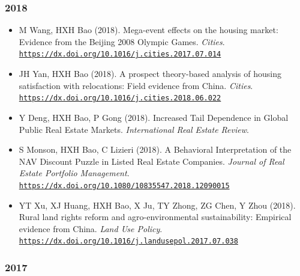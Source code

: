 \documentclass[11pt,a4paper]{article}
\providecommand{\tightlist}{%
  \setlength{\itemsep}{1pt}\setlength{\parskip}{0pt}}
\begin{document}
\subsubsection{2018}\label{section-8}

\begin{itemize}
\tightlist
\item
  M Wang, HXH Bao (2018). Mega-event effects on the housing market:
  Evidence from the Beijing 2008 Olympic Games. \emph{Cities}.
  \href{https://dx.doi.org/10.1016/j.cities.2017.07.014}{\nolinkurl{https://dx.doi.org/10.1016/j.cities.2017.07.014}}
\item
  JH Yan, HXH Bao (2018). A prospect theory-based analysis of housing
  satisfaction with relocations: Field evidence from China.
  \emph{Cities}.
  \href{https://dx.doi.org/10.1016/j.cities.2018.06.022}{\nolinkurl{https://dx.doi.org/10.1016/j.cities.2018.06.022}}
\item
  Y Deng, HXH Bao, P Gong (2018). Increased Tail Dependence in Global
  Public Real Estate Markets. \emph{International Real Estate Review}.
\item
  S Monson, HXH Bao, C Lizieri (2018). A Behavioral Interpretation of
  the NAV Discount Puzzle in Listed Real Estate Companies. \emph{Journal
  of Real Estate Portfolio Management}.
  \href{https://dx.doi.org/10.1080/10835547.2018.12090015}{\nolinkurl{https://dx.doi.org/10.1080/10835547.2018.12090015}}
\item
  YT Xu, XJ Huang, HXH Bao, X Ju, TY Zhong, ZG Chen, Y Zhou (2018).
  Rural land rights reform and agro-environmental sustainability:
  Empirical evidence from China. \emph{Land Use Policy}.
  \href{https://dx.doi.org/10.1016/j.landusepol.2017.07.038}{\nolinkurl{https://dx.doi.org/10.1016/j.landusepol.2017.07.038}}
\end{itemize}

\subsubsection{2017}\label{section-9}
\end{document}
